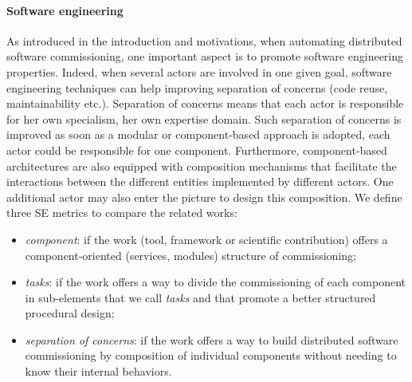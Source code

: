 \paragraph{Software engineering}
As introduced in the introduction and motivations, when automating distributed software commissioning, one important aspect is to promote software engineering properties. Indeed, when several actors are involved in one given goal, software engineering techniques can help improving separation of concerns (\ie code reuse, maintainability etc.). Separation of concerns means that each actor is responsible for her own specialism, \ie her own expertise domain. Such separation of concerns is improved as soon as a modular or component-based approach is adopted, \ie each actor could be responsible for one component. Furthermore, component-based architectures are also equipped with composition mechanisms that facilitate the interactions between the different entities implemented by different actors. One additional actor may also enter the picture to design this composition. We define three SE metrics to compare the related works:
\begin{itemize}
	\item \emph{component}: if the work (tool, framework or scientific contribution) offers a component-oriented (\eg services, modules) structure of commissioning;
	\item \emph{tasks}: if the work offers a way to divide the commissioning of each component in sub-elements that we call \emph{tasks} and that promote a better structured procedural design;
	\item \emph{separation of concerns}: if the work offers a way to build distributed software commissioning by composition of individual components without needing to know their internal behaviors.
\end{itemize}

